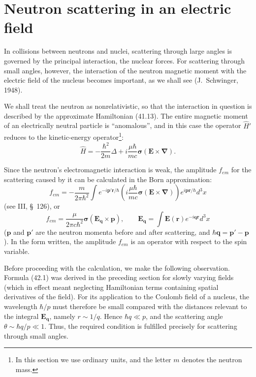 \section{Neutron scattering in an electric field}

In collisions between neutrons and nuclei, scattering through large angles is governed by the principal interaction, the nuclear forces. For scattering through small angles, however, the interaction of the neutron magnetic moment with the electric field of the nucleus becomes important, as we shall see (J.~Schwinger, 1948).

We shall treat the neutron as nonrelativistic, so that the interaction in question is described by the approximate Hamiltonian (41.13). The entire magnetic moment of an electrically neutral particle is ``anomalous'', and in this case the operator $\widehat H'$ reduces to the kinetic-energy operator\footnote{In this section we use ordinary units, and the letter $m$ denotes the neutron mass.}:
\begin{equation}
\widehat H=-\frac{\hbar^2}{2m}\Delta
+i\frac{\mu\hbar}{mc}\boldsymbol\sigma(\mathbf E\times\boldsymbol\nabla).
\tag{42.1}
\end{equation}

Since the neutron's electromagnetic interaction is weak, the amplitude $f_{em}$ for the scattering caused by it can be calculated in the Born approximation:
\[
f_{em}=-\frac m{2\pi\hbar^2}\int e^{-i\mathbf p'\mathbf r/\hbar}
\left(i\frac{\mu\hbar}{mc}\boldsymbol\sigma(\mathbf E\times\boldsymbol\nabla)\right)
e^{i\mathbf p\mathbf r/\hbar}d^3x
\]
(see III, \S~126), or
\begin{equation}
f_{em}=\frac\mu{2\pi c\hbar^2}\boldsymbol\sigma(\mathbf E_{\mathbf q}\times\mathbf p),
\qquad
\mathbf E_{\mathbf q}=\int\mathbf E(\mathbf r)e^{-i\mathbf q\mathbf r}d^3x
\tag{42.2}
\end{equation}
($\mathbf p$ and $\mathbf p'$ are the neutron momenta before and after scattering, and $\hbar\mathbf q=\mathbf p'-\mathbf p$). In the form written, the amplitude $f_{em}$ is an operator with respect to the spin variable.

Before proceeding with the calculation, we make the following observation. Formula (42.1) was derived in the preceding section for slowly varying fields (which in effect meant neglecting Hamiltonian terms containing spatial derivatives of the field). For its application to the Coulomb field of a nucleus, the wavelength $\hbar/p$ must therefore be small compared with the distances relevant to the integral $\mathbf E_{\mathbf q}$, namely $r\sim1/q$. Hence $\hbar q\ll p$, and the scattering angle $\theta\sim\hbar q/p\ll1$. Thus, the required condition is fulfilled precisely for scattering through small angles.

